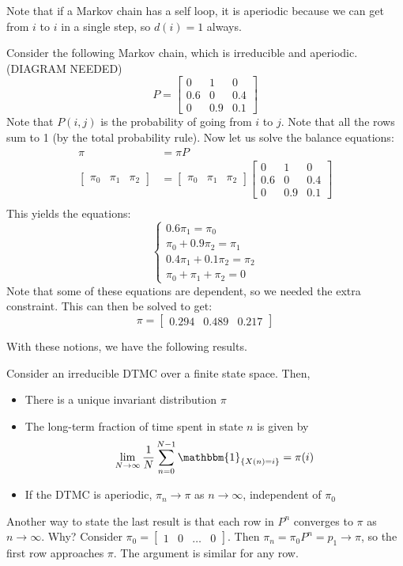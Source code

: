 Note that if a Markov chain has a self loop, it is aperiodic because we can
get from $i$ to $i$ in a single step, so $d(i) = 1$ always.

\begin{example}
    Consider the following Markov chain, which is irreducible and aperiodic.
    (DIAGRAM NEEDED)
    \[ P = \begin{bmatrix}
        0 & 1 & 0 \\
        0.6 & 0 & 0.4 \\
        0 & 0.9 & 0.1
    \end{bmatrix} \]
    Note that $P(i, j)$ is the probability of going from $i$ to $j$. Note that all the rows sum to
    1 (by the total probability rule). Now let us solve the balance equations:
    \begin{align*}
        \pi &= \pi P \\
        \begin{bmatrix}
            \pi_0 & \pi_1 & \pi_2
        \end{bmatrix} &= \begin{bmatrix}
            \pi_0 & \pi_1 & \pi_2
        \end{bmatrix} \begin{bmatrix}
            0 & 1 & 0 \\
            0.6 & 0 & 0.4 \\
            0 & 0.9 & 0.1
        \end{bmatrix} \\
    \end{align*}
    This yields the equations:
    \[
        \begin{cases}
            0.6 \pi_1 = \pi_0 \\
            \pi_0 + 0.9 \pi_2 = \pi_1 \\
            0.4 \pi_1 + 0.1 \pi_2 = \pi_2 \\
            \pi_0 + \pi_1 + \pi_2 = 0
        \end{cases}
    \]
    Note that some of these equations are dependent, so we needed the extra constraint.
    This can then be solved to get:
    \[ \pi = \begin{bmatrix} 0.294 & 0.489 & 0.217 \end{bmatrix} \]
\end{example}

With these notions, we have the following results.

\begin{theorem} 
    Consider an irreducible DTMC over a finite state space. Then,
    \begin{itemize}
        \item There is a unique invariant distribution $\pi$
        \item The long-term fraction of time spent in state $n$ is given by
        \[ \lim_{N \to \infty} \frac{1}{N} \sum_{n = 0}^{N - 1} \mathbbm{1}_{\{X(n) = i\}} = \pi(i) \]
        \item If the DTMC is aperiodic, $\pi_n \to \pi$ as $n \to \infty$, independent of $\pi_0$
    \end{itemize}
\end{theorem}

Another way to state the last result is that each row in $P^n$ converges to $\pi$ as $n \to \infty$. Why?
Consider $\pi_0 = \begin{bmatrix}
    1 & 0 & \dots & 0
\end{bmatrix}$. Then $\pi_n = \pi_0 P^n = p_1 \to \pi$, so the first row approaches $\pi$.
The argument is similar for any row.